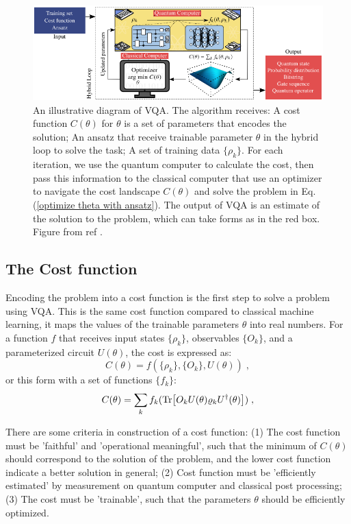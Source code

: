 \begin{figure}
    \centering
    \includegraphics[width=\textwidth]{LiteratureReview/Appendices/vqadiagram.png}
    \caption{
    An illustrative diagram of VQA. The algorithm receives: 
    A cost function $C(\theta)$ for $\theta$ is a set of parameters that encodes the solution; 
    An ansatz that receive trainable parameter $\theta$ in the hybrid loop to solve the task;
    A set of training data $\{\rho_k\}$.
    For each iteration, we use the quantum computer to calculate the cost, then pass this information to the classical computer that use an optimizer to navigate the cost landscape $C(\theta)$ and solve the problem in Eq. (\ref{optimize theta with ansatz}).
    The output of VQA is an estimate of the solution to the problem, which can take forms as in the red box.
    Figure from ref \cite{cerezo2021variational}.
    }
    \label{VQA diagram}
\end{figure}

\subsection{The Cost function}
Encoding the problem into a cost function is the first step to solve a problem using VQA.
This is the same cost function compared to classical machine learning, it maps the values of the trainable parameters $\theta$ into real numbers.
For a function $f$ that receives input states $\{\rho_k\}$, observables $\{O_k\}$, and a parameterized circuit $U(\theta)$, the cost is expressed as:
\begin{equation}
    C(\theta) = f(\{\rho_k\}, \{O_k\}, U(\theta)) \;,
\end{equation}
or this form with a set of functions $\{ f_k \}$:
\begin{equation}
    C(\theta) = \sum_k f_k(\Tr[ O_k U(\theta) \varrho_k U^\dagger(\theta) ]) \;,
    \label{Cost function}
\end{equation}

There are some criteria in construction of a cost function: 
(1) The cost function must be 'faithful' and 'operational meaningful', such that the minimum of $C(\theta)$ should correspond to the solution of the problem, and the lower cost function indicate a better solution in general;
(2) Cost function must be 'efficiently estimated' by measurement on quantum computer and classical post processing;
(3) The cost must be 'trainable', such that the parameters $\theta$ should be efficiently optimized.

